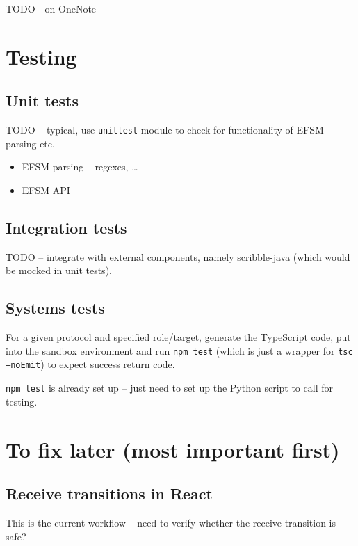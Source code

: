 \documentclass{article}
\begin{document}
TODO - on OneNote

\section{Testing}

\subsection{Unit tests}
TODO -- typical, use \texttt{unittest} module
to check for functionality of EFSM parsing
etc.

\begin{itemize}
\item EFSM parsing -- regexes, \dots
\item EFSM API
\end{itemize}

\subsection{Integration tests}
TODO -- integrate with external components, namely
scribble-java (which would be mocked in unit tests).

\subsection{Systems tests}
For a given protocol and specified role/target,
generate the TypeScript code, put into the
sandbox environment and run \texttt{npm test} 
(which is just a wrapper for 
\texttt{tsc --noEmit})
to expect success return code.

\texttt{npm test} is already set up -- just need to
set up the Python script to call for testing.

\section{To fix later (most important first)}

\subsection*{Receive transitions in React}
This is the current workflow -- need to verify whether the receive transition is safe?
\end{document}
